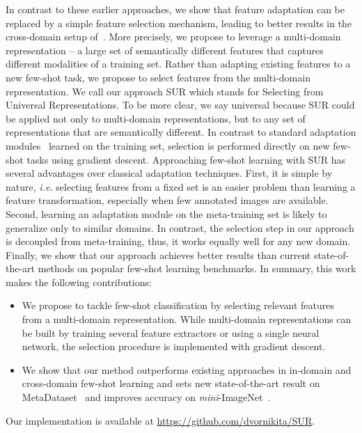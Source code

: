 \documentclass[runningheads]{llncs}
\begin{document}
In contrast to these earlier approaches, we show that feature adaptation can be replaced by 
a simple feature selection mechanism, leading to better results  in the
cross-domain setup of~\cite{triantafillou2019meta}.
More precisely, we propose to
leverage a multi-domain representation -- a large set of semantically different features
that captures different modalities of a training set. Rather than adapting existing
features to a new few-shot task, we propose to select features from the
multi-domain representation. We call our approach SUR which stands for Selecting
from Universal Representations. To be more clear, we say universal because SUR
could be applied not only to multi-domain representations, but to any set of
representations that are semantically different. In contrast to standard adaptation
modules~\cite{oreshkin2018tadam,requeima2019fast,triantafillou2019meta} learned
on the training set, selection is performed directly on new few-shot tasks using
gradient descent.
Approaching few-shot learning with SUR has several advantages over
classical adaptation techniques. First, it is simple by nature, \textit{i.e.} selecting
features from a fixed set is an easier problem than learning a feature
transformation, especially when few annotated images are available. Second,
learning an adaptation module on the meta-training set is likely to generalize
only to similar domains.
In contrast, the selection step in our approach is decoupled from
meta-training, thus, it works equally well for any new domain.
Finally, we show that our approach achieves better results than current
state-of-the-art methods on popular few-shot learning benchmarks. In summary,
this work makes the following contributions:
\begin{itemize}
  \item We propose to tackle few-shot classification by selecting relevant
    features from a multi-domain representation. While multi-domain representations
    can be built by training several feature extractors or using a single
    neural network, the selection procedure is implemented with gradient descent.
  \item We show that our method outperforms existing approaches in in-domain and
    cross-domain few-shot learning and sets new state-of-the-art result on
    MetaDataset~\cite{triantafillou2019meta} and improves accuracy on
    \textit{mini}-ImageNet~\cite{ravioptimization}.
\end{itemize}
Our implementation is available at \url{https://github.com/dvornikita/SUR}.
 
\end{document}
